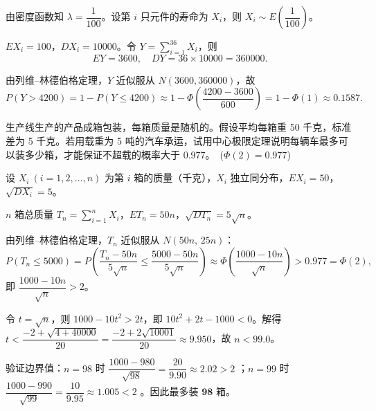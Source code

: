 ﻿\documentclass[lang=cn,11pt]{elegantbook}
\begin{document}
\begin{solution}
由密度函数知 \(\lambda = \dfrac{1}{100}\)。设第 \(i\) 只元件的寿命为 \(X_i\)，则 \(X_i \sim E\!\left(\dfrac{1}{100}\right)\)。

\(EX_i = 100\)，\(DX_i = 10000\)。令 \(Y = \displaystyle\sum_{i=1}^{36} X_i\)，则
\[
EY = 3600,\quad DY = 36 \times 10000 = 360000.
\]

由列维--林德伯格定理，\(Y\) 近似服从 \(N(3600, 360000)\)，故
\[
P(Y > 4200) = 1 - P(Y \leq 4200) \approx 1 - \Phi\!\left(\frac{4200 - 3600}{600}\right) = 1 - \Phi(1) \approx 0.1587.
\]
\end{solution}

\begin{exercise}\label{exer:5-clt-box}
生产线生产的产品成箱包装，每箱质量是随机的。假设平均每箱重 50 千克，标准差为 5 千克。若用载重为 5 吨的汽车承运，试用中心极限定理说明每辆车最多可以装多少箱，才能保证不超载的概率大于 0.977。\ (\(\Phi(2) = 0.977\))
\end{exercise}

\begin{solution}
设 \(X_i\ (i=1,2,\dots,n)\) 为第 \(i\) 箱的质量（千克），\(X_i\) 独立同分布，\(EX_i = 50\)，\(\sqrt{DX_i} = 5\)。

\(n\) 箱总质量 \(T_n = \displaystyle\sum_{i=1}^{n} X_i\)，\(ET_n = 50n\)，\(\sqrt{DT_n} = 5\sqrt{n}\)。

由列维--林德伯格定理，\(T_n\) 近似服从 \(N(50n,\, 25n)\)：
\[
P(T_n \leq 5000) = P\!\left(\frac{T_n - 50n}{5\sqrt{n}} \leq \frac{5000 - 50n}{5\sqrt{n}}\right) \approx \Phi\!\left(\frac{1000 - 10n}{\sqrt{n}}\right) > 0.977 = \Phi(2),
\]
即 \(\dfrac{1000 - 10n}{\sqrt{n}} > 2\)。

令 \(t = \sqrt{n}\)，则 \(1000 - 10t^2 > 2t\)，即 \(10t^2 + 2t - 1000 < 0\)。解得 \(t < \dfrac{-2 + \sqrt{4+40000}}{20} = \dfrac{-2+2\sqrt{10001}}{20} \approx 9.950\)，故 \(n < 99.0\)。

验证边界值：\(n=98\) 时 \(\dfrac{1000-980}{\sqrt{98}} = \dfrac{20}{9.90} \approx 2.02 > 2\) ；\(n=99\) 时 \(\dfrac{1000-990}{\sqrt{99}} = \dfrac{10}{9.95} \approx 1.005 < 2\) 。因此最多装 \(\mathbf{98}\) 箱。
\end{solution}
\end{document}
